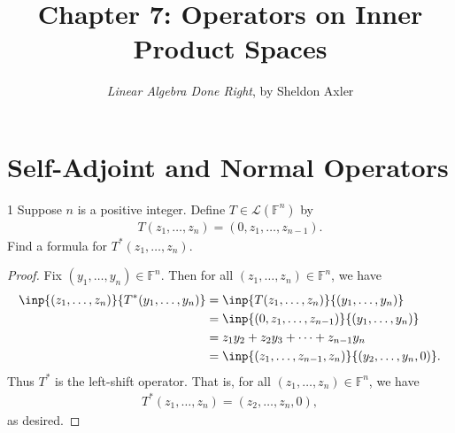 \documentclass{extarticle}
\title{\vspace{-2em}Chapter 7: Operators on Inner Product Spaces}
\author{\emph{Linear Algebra Done Right}, by Sheldon Axler}
\date{}
\newenvironment{problem}[1]{\begin{prob*}{#1}{}}{\end{prob*}}
\newcommand{\F}{\mathbb{F}}
\newcommand{\Hom}{\mathcal{L}}
\begin{document}
\maketitle



\section{Self-Adjoint and Normal Operators}

\begin{problem}{1}
Suppose $n$ is a positive integer.  Define $T\in\Hom(\F^n)$ by
\begin{align*}
T(z_1, \dots, z_n) = (0, z_1, \dots, z_{n-1}).
\end{align*}
Find a formula for $T^\ast(z_1,\dots, z_n)$.
\end{problem}
\begin{proof}
Fix $(y_1,\dots, y_n)\in\F^n$.  Then for all $(z_1,\dots, z_n)\in \F^n$, we have
\begin{align*}
\inp{(z_1,\dots, z_n)}{T^\ast(y_1,\dots, y_n)} &= \inp{T(z_1,\dots, z_n)}{(y_1,\dots, y_n)}\\
&= \inp{(0, z_1,\dots, z_{n-1})}{(y_1,\dots, y_n)}\\
&= z_1y_2 + z_2y_3 + \dots + z_{n-1}y_n\\
&=\inp{(z_1,\dots, z_{n-1}, z_n)}{(y_2, \dots, y_n, 0)}.
\end{align*}
Thus $T^*$ is the left-shift operator.  That is, for all $(z_1,\dots, z_n)\in \F^n$, we have
\begin{align*}
T^\ast(z_1,\dots, z_n) = (z_2, \dots, z_n, 0),
\end{align*}
as desired.
\end{proof}
\end{document}
